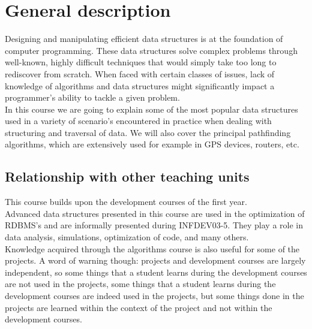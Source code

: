 \section{General description}
	Designing and manipulating efficient data structures is at the foundation of computer programming. 
	These data structures solve complex problems through well-known, highly difficult techniques that would simply take too long to rediscover from scratch. When faced with certain classes of issues, lack of knowledge of algorithms and data structures might significantly impact a programmer's ability to tackle a given problem. \\	
	In this course we are going to explain some of the most popular data structures used in a variety of scenario's encountered in practice when dealing with structuring and traversal of data. 
	We will also cover the principal pathfinding algorithms, which are extensively used for example in GPS devices, routers, etc.  \\

	\subsection{Relationship with other teaching units}
		This course builds upon the development courses of the first year.	\\		

		Advanced data structures presented in this course are used in the optimization of RDBMS's and are informally presented during INFDEV03-5. They play a role in data analysis, simulations, optimization of code, and many others. \\
		
		Knowledge acquired through the algorithms course is also useful for some of the projects. A word of warning though: projects and development courses are largely independent, so some things that a student learns during the development courses are not used in the projects, some things that a student learns during the development courses are indeed used in the projects, but some things done in the projects are learned within the context of the project and not within the development courses.
